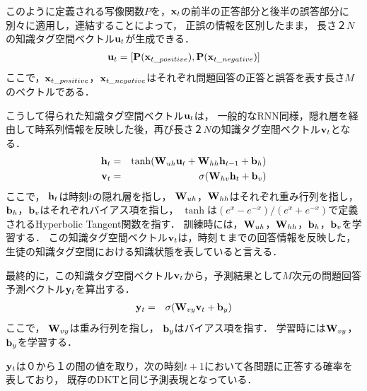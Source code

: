 このように定義される写像関数$P$を，${\bf x}_t$の前半の正答部分と後半の誤答部分に別々に適用し，連結することによって，
正誤の情報を区別したまま，
長さ$２N$の知識タグ空間ベクトル${\bf u}_t$が生成できる．
\begin{eqnarray}
{\bf u}_t = [{\bf P}({\bf x}_{t\_positive}), {\bf P}({\bf x}_{t\_negative})]
\end{eqnarray}
ここで，${\bf x}_{t\_positive}$，${\bf x}_{t\_negative}$はそれぞれ問題回答の正答と誤答を表す長さ$M$のベクトルである．

こうして得られた知識タグ空間ベクトル${\bf u}_t$は，
一般的なRNN同様，隠れ層を経由して時系列情報を反映した後，再び長さ$２N$の知識タグ空間ベクトル${\bf v}_t$となる．
\begin{eqnarray}
{\bf h}_t &=& \tanh({\bf W}_{uh} {\bf u}_t + {\bf W}_{hh}  {\bf h}_{t-1} + {\bf b}_h)\\
{\bf v}_t &=& \sigma( {\bf W}_{hv} {\bf h}_t + {\bf b}_v)
\end{eqnarray}
ここで，
${\bf h}_t$は時刻$t$の隠れ層を指し，
${\bf W}_{uh}$，${\bf W}_{hh}$はそれぞれ重み行列を指し，
${\bf b}_h$，${\bf b}_v$はそれぞれバイアス項を指し，
$\tanh$は$( e^x - e^{-x} )/( e^x + e^{-x} )$で定義されるHyperbolic Tangent関数を指す．
訓練時には，${\bf W}_{uh}$，${\bf W}_{hh}$，${\bf b}_h$，${\bf b}_v$を学習する．
この知識タグ空間ベクトル${\bf v}_t$は，時刻$ｔ$までの回答情報を反映した，生徒の知識タグ空間における知識状態を表していると言える．

最終的に，この知識タグ空間ベクトル${\bf v}_t$から，予測結果として$M$次元の問題回答予測ベクトル${\bf y}_t$を算出する．
\begin{eqnarray}
{\bf y}_t &=& \sigma( {\bf W}_{vy} {\bf v}_t + {\bf b}_y)
\end{eqnarray}
ここで，
${\bf W}_{vy}$は重み行列を指し，
${\bf b}_y$はバイアス項を指す．
学習時には${\bf W}_{vy}$，${\bf b}_y$を学習する．

${\bf y}_t$は０から１の間の値を取り，次の時刻$t+1$において各問題に正答する確率を表しており，
既存のDKTと同じ予測表現となっている．


